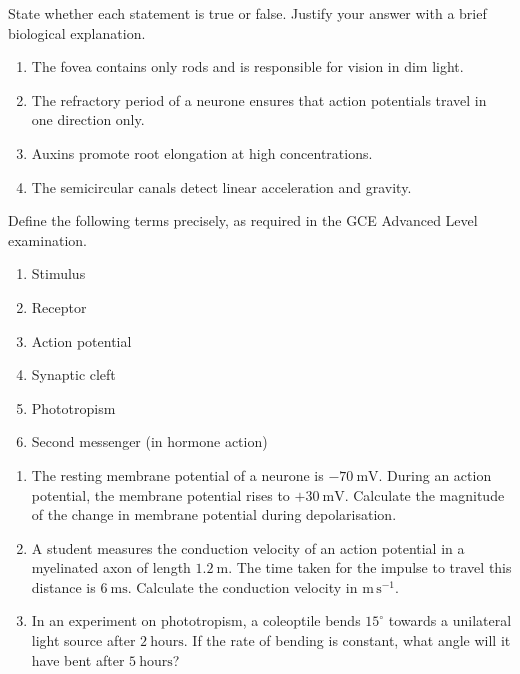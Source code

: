 \documentclass[11pt]{article}
\newcommand{\cle}[1]{{\popxbold\color{popdark}#1}}
\begin{document}
\begin{exercice}
State whether each statement is true or false. Justify your answer with a brief biological explanation.

\begin{enumerate}
\item The fovea contains only rods and is responsible for vision in dim light.
\item The refractory period of a neurone ensures that action potentials travel in one direction only.
\item Auxins promote root elongation at high concentrations.
\item The semicircular canals detect linear acceleration and gravity.
\end{enumerate}
\end{exercice}

\begin{exercice}[Definitions]
Define the following terms precisely, as required in the GCE Advanced Level examination.

\begin{enumerate}
\item \cle{Stimulus}
\item \cle{Receptor}
\item \cle{Action potential}
\item \cle{Synaptic cleft}
\item \cle{Phototropism}
\item \cle{Second messenger} (in hormone action)
\end{enumerate}
\end{exercice}

\begin{exercice}
\begin{enumerate}
\item The resting membrane potential of a neurone is $-70\ \mathrm{mV}$. During an action potential, the membrane potential rises to $+30\ \mathrm{mV}$. Calculate the magnitude of the change in membrane potential during depolarisation.
\item A student measures the conduction velocity of an action potential in a myelinated axon of length $1.2\ \mathrm{m}$. The time taken for the impulse to travel this distance is $6\ \mathrm{ms}$. Calculate the conduction velocity in $\mathrm{m\,s^{-1}}$.
\item In an experiment on phototropism, a coleoptile bends $15^\circ$ towards a unilateral light source after $2\ \mathrm{hours}$. If the rate of bending is constant, what angle will it have bent after $5\ \mathrm{hours}$?
\end{enumerate}
\end{exercice}
\end{document}
